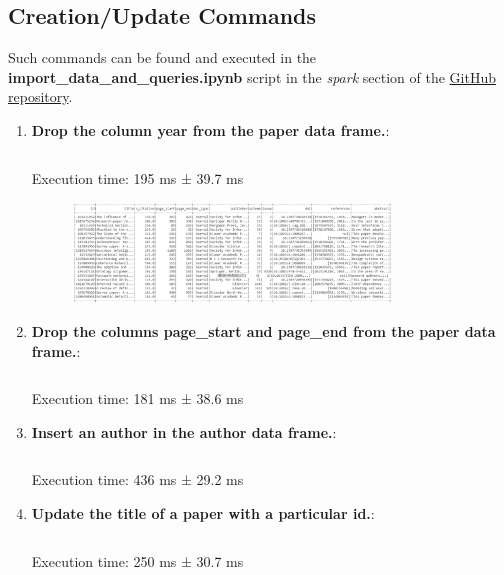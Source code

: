 \documentclass{Configuration_Files/PoliMi3i_thesis}
\begin{document}
\subsection{Creation/Update Commands}
Such commands can be found and executed in the \textbf{import\_data\_and\_queries.ipynb} script in the \textit{spark} section of the \href{https://github.com/albertopirillo/smbud-project-2022}{GitHub repository}.

\begin{enumerate}
    \item \textbf{Drop the column year from the paper data frame.}:
    \inputminted[linenos,tabsize=2,breaklines]{Python}{code/commands_spark/cmd_1.txt}
    Execution time: 195 ms ± 39.7 ms
    \begin{figure}[H]
        \centering
         \includegraphics[width=0.8\textwidth]{Images/commands_spark/cmd_1.jpg}
    \end{figure} 
    
    \item \textbf{Drop the columns page\_start and page\_end from the paper data frame.}:
    \inputminted[linenos,tabsize=2,breaklines]{Python}{code/commands_spark/cmd_2.txt}
    Execution time: 181 ms ± 38.6 ms
    \begin{figure}[H]
        \centering
    \end{figure} 
    
    \item \textbf{Insert an author in the author data frame.}:
    \inputminted[linenos,tabsize=2,breaklines]{Python}{code/commands_spark/cmd_3.txt}
    Execution time: 436 ms ± 29.2 ms
    \begin{figure}[H]
        \centering
    \end{figure} 
    
    \item \textbf{Update the title of a paper with a particular id.}:
    \inputminted[linenos,tabsize=2,breaklines]{Python}{code/commands_spark/cmd_4.txt}
    Execution time: 250 ms ± 30.7 ms 
    \begin{figure}[H]
        \centering
    \end{figure} 
    

\end{enumerate}
\end{document}
